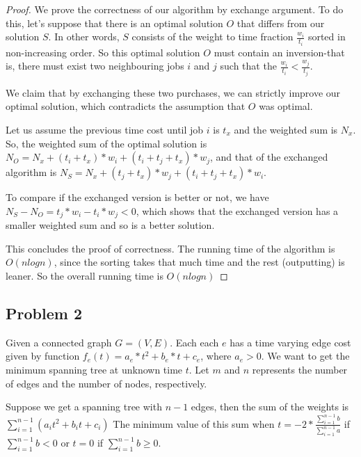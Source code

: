 \documentclass[paper=a4, fontsize=11pt]{scrartcl} %
\numberwithin{equation}{section} %
\numberwithin{figure}{section} %
\numberwithin{table}{section} %
\begin{document}
\begin{proof}

We prove the correctness of our algorithm by exchange argument. To do this, let's suppose that there is an optimal solution $O$ that differs from our solution $S$. In other words, $S$ consists of the weight to time fraction $\frac{w_i}{t_i}$ sorted in non-increasing order. So this optimal solution $O$ must contain an inversion-that is, there must exist two neighbouring jobs $i$ and $j$ such that the $\frac{w_i}{t_i} < \frac{w_j}{t_j}$.

We claim that by exchanging these two purchases, we can strictly improve our optimal solution, which contradicts the assumption that $O$ was optimal. 

Let us assume the previous time cost until job $i$ is $t_x$ and the weighted sum is $N_x$. So, the weighted sum of the optimal solution is $N_O = N_x + (t_i + t_x) * w_i + (t_i + t_j + t_x) * w_j$, and that of the exchanged algorithm is $N_S = N_x + (t_j + t_x) * w_j + (t_i + t_j + t_x) * w_i$. 

To compare if the exchanged version is better or not, we have $N_S - N_O = t_j * w_i - t_i * w_j < 0$, which shows that the exchanged version has a smaller weighted sum and so is a better solution. 

This concludes the proof of correctness. The running time of the algorithm is $O(nlogn)$, since the sorting takes that much time and the rest (outputting) is leaner. So the overall running time is $O(nlogn)$

\end{proof}


\subsection*{Problem 2}

Given a connected graph $G = (V, E)$. Each each $e$ has a time varying edge cost given by function $f_e(t) = a_e * t^2 + b_e * t + c_e$, where $a_e > 0$. We want to get the minimum spanning tree at unknown time $t$. Let $m$ and $n$ represents the number of edges and the number of nodes, respectively.

Suppose we get a spanning tree with $n-1$ edges, then the sum of the weights is $\sum_{i=1}^{n-1} {(a_it^2 + b_it + c_i)}$
The minimum value of this sum when $t = -2*\frac{\sum_{i=1}^{n-1}{b}}{\sum_{i=1}^{n-1}{a}}$ if $\sum_{i=1}^{n-1}{b} < 0$ or $t = 0$ if $\sum_{i=1}^{n-1}{b} \geq 0$.
\end{document}
